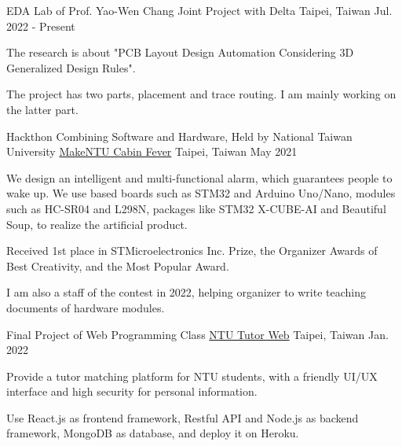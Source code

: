 
\begin{cventries}
  \cventry
    {EDA Lab of Prof. Yao-Wen Chang} %
    {Joint Project with Delta} %
    {Taipei, Taiwan} %
    {Jul. 2022 - Present} %
    {
      \begin{cvitems} %
        \item {The research is about "PCB Layout Design Automation Considering 3D Generalized Design Rules". }
        \item {The project has two parts, placement and trace routing. I am mainly working on the latter part.}
      \end{cvitems}
    }
    
  \cventry
    {Hackthon Combining Software and Hardware, Held by National Taiwan University} %
    {\href{https://github.com/MakeNTU/2021_MakeNTU_Summary}{MakeNTU Cabin Fever}} %
    {Taipei, Taiwan} %
    {May 2021} %
    {
      \begin{cvitems} %
        \item {We design an intelligent and multi-functional alarm, which guarantees people to wake up. We use based boards such as STM32 and Arduino Uno/Nano, modules such as HC-SR04 and L298N, packages like STM32 X-CUBE-AI and Beautiful Soup, to realize the artificial product. }
        \item {Received 1st place in STMicroelectronics Inc. Prize, the Organizer Awards of Best Creativity, and the Most Popular Award.}
        \item {I am also a staff of the contest in 2022, helping organizer to write teaching documents of hardware modules.}
      \end{cvitems}
    }

  \cventry
    {Final Project of Web Programming Class} %
    {\href{https://github.com/Alanhsiu/wp1101_final}{NTU Tutor Web}} %
    {Taipei, Taiwan} %
    {Jan. 2022} %
    {
      \begin{cvitems} %
        \item {Provide a tutor matching platform for NTU students, with a friendly UI/UX interface and high security for personal information.}
        \item {Use React.js as frontend framework, Restful API and Node.js as backend framework, MongoDB as database, and deploy it on Heroku.}
      \end{cvitems}
    }


\end{cventries}
